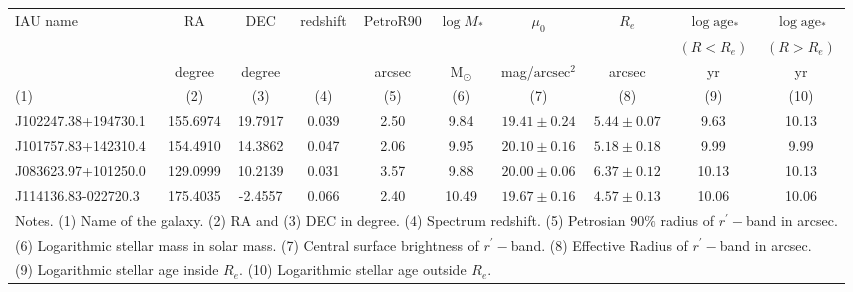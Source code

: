 \documentclass[fleqn,usenatbib]{mnras}
\begin{document}
\begin{table*}
\centering
{}
\begin{tabular}{lccccccccc} 
\hline
IAU name	&	RA	&	DEC	&	redshift	&	$\mathrm{PetroR90}$	&	$\log M_*$	&	$\mu_0$	&	$R_e$	&	$\log \mathrm{age_*}$	&	$\log \mathrm{age_*}$	\\
& & & & & & & & $(R<R_e)$ & $(R>R_e)$ \\
&	degree	&	degree	&		&	arcsec	&	$\mathrm{M_\odot}$	&		mag/$\mathrm{arcsec^2}$				&		arcsec				&	yr	&	yr	\\
(1) & (2) & (3) & (4) & (5) & (6) & (7) & (8) & (9) & (10) \\
\hline
J102247.38+194730.1	&	155.6974	&	19.7917	&	0.039	&	2.50	&	9.84	&	$	19.41	\pm	0.24	$	&	$	5.44	\pm	0.07	$	&	9.63	&	10.13	\\
J101757.83+142310.4	&	154.4910	&	14.3862	&	0.047	&	2.06	&	9.95	&	$	20.10	\pm	0.16	$	&	$	5.18	\pm	0.18	$	&	9.99	&	9.99	\\
J083623.97+101250.0	&	129.0999	&	10.2139	&	0.031	&	3.57	&	9.88	&	$	20.00	\pm	0.06	$	&	$	6.37	\pm	0.12	$	&	10.13	&	10.13	\\
J114136.83-022720.3	&	175.4035	&	-2.4557	&	0.066	&	2.40	&	10.49	&	$	19.67	\pm	0.16	$	&	$	4.57	\pm	0.13	$	&	10.06	&	10.06	\\
\hline
\multicolumn{10}{l}{ Notes. (1) Name of the galaxy. (2) RA and (3) DEC in degree. (4) Spectrum redshift. (5) Petrosian $90\%$ radius of $r^{\prime}-$band in arcsec. }\\
\multicolumn{10}{l}{ (6) Logarithmic stellar mass in solar mass. (7) Central surface brightness of $r^{\prime}-$band. (8) Effective Radius of $r^{\prime}-$band in arcsec.}\\
\multicolumn{10}{l}{ (9) Logarithmic stellar age inside $R_e$. (10) Logarithmic stellar age outside $R_e$.}
\end{tabular}
\end{table*}




\bsp	%
\label{lastpage}
\end{document}
